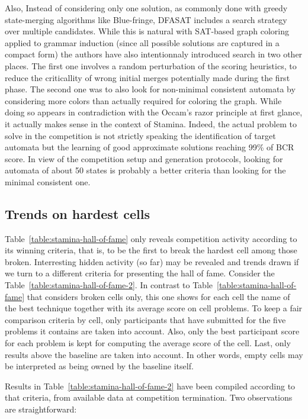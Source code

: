 Also, Instead of considering only one solution, as commonly done with greedy state-merging algorithms like Blue-fringe, DFASAT includes a search strategy over multiple candidates. While this is natural with SAT-based graph coloring applied to grammar induction (since all possible solutions are captured in a compact form) the authors have also intentionnaly introduced search in two other places. The first one involves a random perturbation of the scoring heuristics, to reduce the criticallity of wrong initial merges potentially made during the first phase. The second one was to also look for non-minimal consistent automata by considering more colors than actually required for coloring the graph. While doing so appears in contradiction with the Occam's razor principle at first glance, it actually makes sense in the context of Stamina. Indeed, the actual problem to solve in the competition is not strictly speaking the identification of target automata but the learning of good approximate solutions reaching 99\% of BCR score. In view of the competition setup and generation protocols, looking for automata of about 50 states is probably a better criteria than looking for the minimal consistent one.

\subsection{Trends on hardest cells\label{subsection:stamina-trends-on-hardest-cells}}

Table~\ref{table:stamina-hall-of-fame} only reveals competition activity according to its winning criteria, that is, to be the first to break the hardest cell among those broken. Interresting hidden activity (so far) may be revealed and trends drawn if we turn to a different criteria for presenting the hall of fame. Consider the Table~\ref{table:stamina-hall-of-fame-2}. In contrast to Table~\ref{table:stamina-hall-of-fame} that considers broken cells only, this one shows for each cell the name of the best technique together with its average score on cell problems. To keep a fair comparison criteria by cell, only participants that have submitted for the five problems it contains are taken into account. Also, only the best participant score for each problem is kept for computing the average score of the cell. Last, only results above the baseline are taken into account. In other words, empty cells may be interpreted as being owned by the baseline itself. 

Results in Table~\ref{table:stamina-hall-of-fame-2} have been compiled according to that criteria, from available data at competition termination. Two observations are straightforward: 


